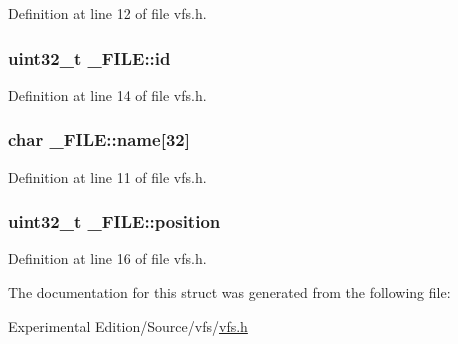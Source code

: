 Definition at line 12 of file vfs.\+h.

\subsubsection[{\texorpdfstring{id}{id}}]{\setlength{\rightskip}{0pt plus 5cm}uint32\+\_\+t \+\_\+\+F\+I\+L\+E\+::id}\hypertarget{struct__FILE_a72ed78f2e1d6b6fb661c1cb69ff288c7}{}\label{struct__FILE_a72ed78f2e1d6b6fb661c1cb69ff288c7}


Definition at line 14 of file vfs.\+h.

\subsubsection[{\texorpdfstring{name}{name}}]{\setlength{\rightskip}{0pt plus 5cm}char \+\_\+\+F\+I\+L\+E\+::name\mbox{[}32\mbox{]}}\hypertarget{struct__FILE_a8b3af56d97e2466fd17f621e858f5997}{}\label{struct__FILE_a8b3af56d97e2466fd17f621e858f5997}


Definition at line 11 of file vfs.\+h.

\subsubsection[{\texorpdfstring{position}{position}}]{\setlength{\rightskip}{0pt plus 5cm}uint32\+\_\+t \+\_\+\+F\+I\+L\+E\+::position}\hypertarget{struct__FILE_a01f2ebf13d03e5fca5db23156b4a10c4}{}\label{struct__FILE_a01f2ebf13d03e5fca5db23156b4a10c4}


Definition at line 16 of file vfs.\+h.



The documentation for this struct was generated from the following file\+:\begin{DoxyCompactItemize}
\item 
Experimental Edition/\+Source/vfs/\hyperlink{vfs_8h}{vfs.\+h}\end{DoxyCompactItemize}
